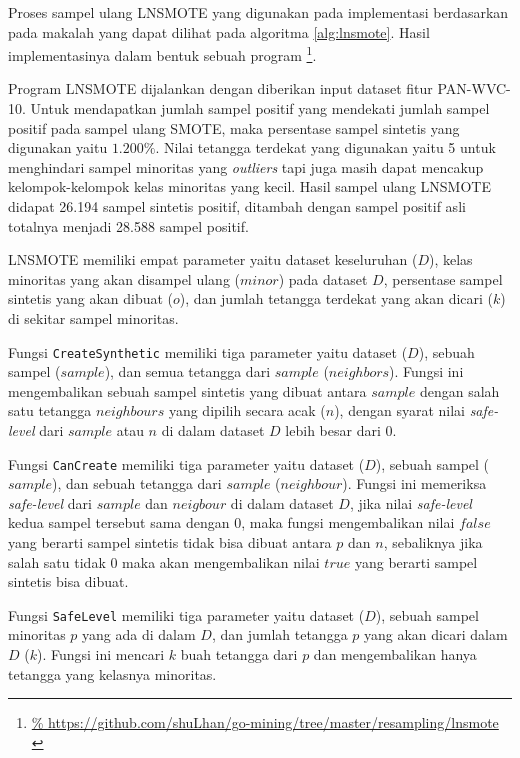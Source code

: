 Proses sampel ulang LNSMOTE yang digunakan pada implementasi berdasarkan
pada makalah
\textcite{maciejewski2011local}
yang dapat dilihat pada algoritma
\ref{alg:lnsmote}.
Hasil implementasinya dalam bentuk sebuah program
\footnote{\url{%
https://github.com/shuLhan/go-mining/tree/master/resampling/lnsmote
}}.

Program LNSMOTE dijalankan dengan diberikan input dataset fitur PAN-WVC-10.
Untuk mendapatkan jumlah sampel positif yang mendekati jumlah sampel positif
pada sampel ulang SMOTE, maka persentase sampel sintetis yang digunakan yaitu
$1.200\%$.
Nilai tetangga terdekat yang digunakan yaitu 5 untuk menghindari sampel
minoritas yang \textit{outliers} tapi juga masih dapat mencakup
kelompok-kelompok kelas minoritas yang kecil.
Hasil sampel ulang LNSMOTE didapat 26.194 sampel sintetis positif, ditambah
dengan sampel positif asli totalnya menjadi 28.588 sampel positif.

	

LNSMOTE memiliki empat parameter yaitu dataset keseluruhan ($D$), kelas
minoritas yang akan disampel ulang ($minor$) pada dataset $D$, persentase
sampel sintetis yang akan dibuat ($o$), dan jumlah tetangga terdekat yang akan
dicari ($k$) di sekitar sampel minoritas.

Fungsi \texttt{CreateSynthetic} memiliki tiga parameter yaitu dataset ($D$),
sebuah sampel ($sample$), dan semua tetangga dari $sample$ ($neighbors$).
Fungsi ini mengembalikan sebuah sampel sintetis yang dibuat antara $sample$
dengan salah satu tetangga $neighbours$ yang dipilih secara acak ($n$), dengan
syarat nilai \textit{safe-level} dari $sample$ atau $n$ di dalam dataset $D$
lebih besar dari $0$.

Fungsi \texttt{CanCreate} memiliki tiga parameter yaitu dataset ($D$), sebuah
sampel ($sample$), dan sebuah tetangga dari $sample$ ($neighbour$).
Fungsi ini memeriksa \textit{safe-level} dari $sample$ dan $neigbour$ di dalam
dataset $D$, jika nilai \textit{safe-level} kedua sampel tersebut sama dengan
0, maka fungsi mengembalikan nilai $false$ yang berarti sampel sintetis tidak
bisa dibuat antara $p$ dan $n$, sebaliknya jika salah satu tidak 0
maka akan mengembalikan nilai $true$ yang berarti sampel sintetis bisa dibuat.

Fungsi \texttt{SafeLevel} memiliki tiga parameter yaitu dataset ($D$), sebuah
sampel minoritas $p$ yang ada di dalam $D$, dan jumlah tetangga $p$ yang akan dicari
dalam $D$ ($k$).
Fungsi ini mencari $k$ buah tetangga dari $p$ dan mengembalikan hanya tetangga
yang kelasnya minoritas.

